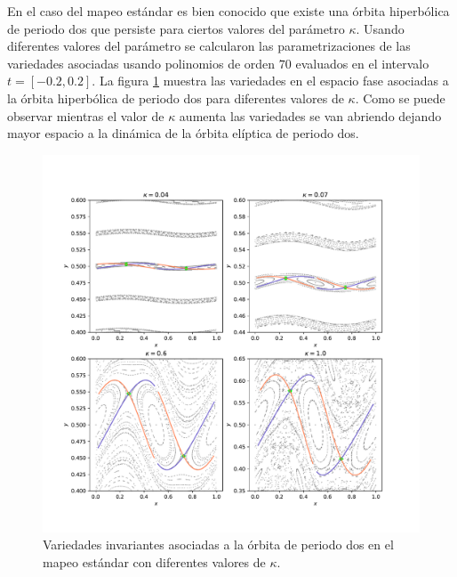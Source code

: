 En el caso del mapeo est\'andar es bien conocido que existe una \'orbita hiperb\'olica de periodo dos que persiste para ciertos valores del par\'ametro $\kappa$. Usando diferentes valores del par\'ametro se calcularon las parametrizaciones de las variedades asociadas usando polinomios de orden $70$ evaluados en el intervalo $t=[-0.2,0.2]$. La figura \ref{estandarvariedadesperiodo2} muestra las variedades en el espacio fase asociadas a la \'orbita hiperb\'olica de periodo dos para diferentes valores de $\kappa$. Como se puede observar mientras el valor de $\kappa$ aumenta las variedades se van abriendo dejando mayor espacio a la din\'amica de la \'orbita el\'iptica de periodo dos. \\



\begin{figure}
	\centering
	\includegraphics[scale=0.6]{variedadesestandarperiodo2}
	\caption{Variedades invariantes asociadas a la \'orbita de periodo dos en el mapeo est\'andar con diferentes valores de $\kappa$.}
	\label{estandarvariedadesperiodo2}
\end{figure}
